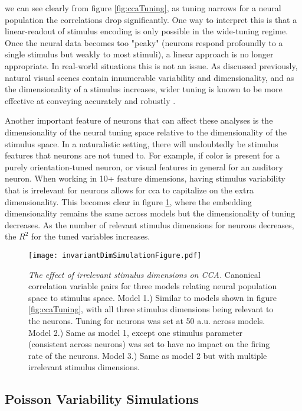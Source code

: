 we can see clearly from figure \ref{fig:ccaTuning}, as tuning narrows for a neural population the correlations drop significantly. One way to interpret this is that a linear-readout of stimulus encoding is only possible in the wide-tuning regime. Once the neural data becomes too "peaky" (neurons respond profoundly to a single stimulus but weakly to most stimuli), a linear approach is no longer appropriate. In real-world situations this is not an issue. As discussed previously, natural visual scenes contain innumerable variability and dimensionality, and as the dimensionality of a stimulus increases, wider tuning is known to be more effective at conveying accurately and robustly \parencite{Brown2006}.

Another important feature of neurons that can affect these analyses is the dimensionality of the neural tuning space relative to the dimensionality of the stimulus space. In a naturalistic setting, there will undoubtedly be stimulus features that neurons are not tuned to. For example, if color is present for a purely orientation-tuned neuron, or visual features in general for an auditory neuron. When working in 10+ feature dimensions, having stimulus variability that is irrelevant for neurons allows for \gls{cca} to capitalize on the extra dimensionality. This becomes clear in figure \ref{fig:ccaInvarDim}, where the embedding dimensionality remains the same across models but the dimensionality of tuning decreases. As the number of relevant stimulus dimensions for neurons decreases, the $R^2$ for the tuned variables increases.

	\begin{figure}
		\centering
		\texttt{[image: invariantDimSimulationFigure.pdf]}
		{\caption{{\it The effect of irrelevant stimulus dimensions on CCA.} Canonical correlation variable pairs for three models relating neural population space to stimulus space. Model 1.) Similar to models shown in figure \ref{fig:ccaTuning}, with all three stimulus dimensions being relevant to the neurons. Tuning for neurons was set at 50 a.u. across models. Model 2.) Same as model 1, except one stimulus parameter (consistent across neurons) was set to have no impact on the firing rate of the neurons. Model 3.) Same as model 2 but with multiple irrelevant stimulus dimensions.}
		\label{fig:ccaInvarDim}}
	\end{figure}


\subsection{Poisson Variability Simulations}

